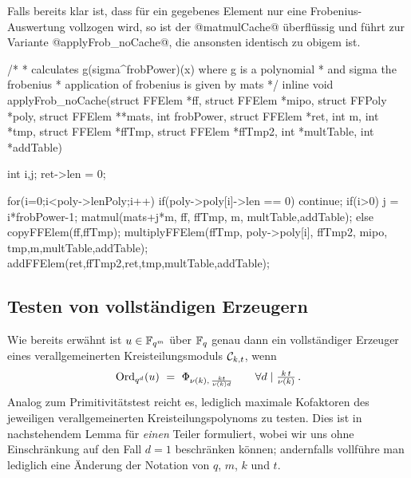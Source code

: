 Falls bereits klar ist, dass für ein gegebenes Element nur eine
Frobenius-Auswertung vollzogen wird, so ist der @matmulCache@ überflüssig und
führt zur Variante @applyFrob_noCache@, die ansonsten identisch zu obigem ist.

\begin{ccode}[caption={Aus \url{../Sage/enumeratePCNs.c}},
  label=lst:applyFrob_noCache]
/*
 * calculates g(sigma^frobPower)(x) where g is a polynomial 
 * and sigma the frobenius
 * application of frobenius is given by mats
 */
inline void applyFrob_noCache(struct FFElem *ff, struct FFElem *mipo,
        struct FFPoly *poly,
        struct FFElem **mats,
        int frobPower, struct FFElem *ret, 
        int m, int *tmp, struct FFElem *ffTmp, struct FFElem *ffTmp2,
        int *multTable, int *addTable){
    int i,j;
    ret->len = 0;
    
    for(i=0;i<poly->lenPoly;i++){
        if(poly->poly[i]->len == 0) continue;
        if(i>0){
            j = i*frobPower-1;
            matmul(mats+j*m, ff, ffTmp, m, multTable,addTable);
        }else{
            copyFFElem(ff,ffTmp);
        }
        multiplyFFElem(ffTmp, poly->poly[i],
                ffTmp2, mipo,
                tmp,m,multTable,addTable);
        addFFElem(ret,ffTmp2,ret,tmp,multTable,addTable);
    }
}
\end{ccode}


\subsection{Testen von vollständigen Erzeugern}

Wie bereits erwähnt ist $u\in \mathbb{F}_{q^m}$ über $\mathbb{F}_q$ genau dann ein vollständiger
Erzeuger eines verallgemeinerten Kreisteilungsmoduls $\mathcal{C}_{k,t}$, wenn
\[ \operatorname{Ord}_{q^d}(u) \ =\  \Phi_{\nu(k),\, \frac{kt}{\nu(k)d}} \qquad
  \forall d\mid \tfrac{k\,t}{\nu(k)}\,.\]
Analog zum Primitivitätstest reicht es, lediglich maximale Kofaktoren des
jeweiligen verallgemeinerten Kreisteilungspolynoms zu testen. 
Dies ist in nachstehendem Lemma für \emph{einen} Teiler
formuliert, wobei wir uns ohne Einschränkung
auf den Fall $d=1$ beschränken können; andernfalls vollführe man lediglich eine
Änderung der Notation von $q$, $m$, $k$ und $t$.

